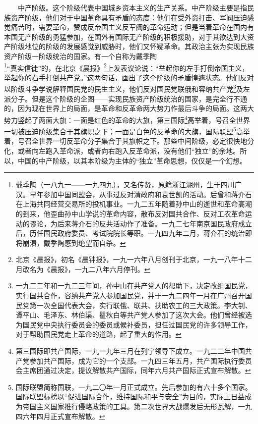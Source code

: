\documentclass[cn,11pt,chinese]{elegantbook}
\begin{document}
　　中产阶级。这个阶级代表中国城乡资本主义的生产关系。中产阶级主要是指民族资产阶级，他们对于中国革命具有矛盾的态度：他们在受外资打击、军阀压迫感觉痛苦时，需要革命，赞成反帝国主义反军阀的革命运动；但是当着革命在国内有本国无产阶级的勇猛参加，在国外有国际无产阶级的积极援助，对于其欲达到大资产阶级地位的阶级的发展感觉到威胁时，他们又怀疑革命。其政治主张为实现民族资产阶级一阶级统治的国家。有一个自称为戴季陶\footnote[2]{ 戴季陶（一八九一——一九四九），又名传贤，原籍浙江湖州，生于四川广汉。早年参加中国同盟会，从事过反对清政府和袁世凯的活动。后曾和蒋介石在上海共同经营交易所的投机事业。一九二五年随着孙中山的逝世和革命高潮的到来，他歪曲孙中山学说的革命内容，散布反对国共合作、反对工农革命运动的谬论，为后来蒋介石的反共活动作了准备。一九二七年南京国民政府成立后，历任国民政府委员、考试院院长等职。一九四九年二月，蒋介石的统治即将崩溃，戴季陶感到绝望而自杀。}“真实信徒”的，在北京《晨报》\footnote[3]{  北京《晨报》，初名《晨钟报》，一九一六年八月创刊于北京，一九一八年十二月改名为《晨报》，一九二八年六月停刊。}上发表议论说：“举起你的左手打倒帝国主义，举起你的右手打倒共产党。”这两句话，画出了这个阶级的矛盾惶遽状态。他们反对以阶级斗争学说解释国民党的民生主义，他们反对国民党联俄和容纳共产党\footnote[4]{ 一九二二年和一九二三年间，孙中山在共产党人的帮助下，决定改组国民党，实行国共合作，容纳共产党人参加国民党，并于一九二四年一月在广州召开国民党第一次全国代表大会，实行联俄、联共、扶助农工的三大政策。李大钊、谭平山、毛泽东、林伯渠、瞿秋白等共产党人参加了这次大会。他们曾经被选为国民党中央执行委员会的委员或候补委员，担任过国民党的许多领导工作，对于帮助国民党走上革命的道路，起了重大的作用。}及左派分子。但是这个阶级的企图——实现民族资产阶级统治的国家，是完全行不通的，因为现在世界上的局面，是革命和反革命两大势力作最后斗争的局面。这两大势力竖起了两面大旗：一面是红色的革命的大旗，第三国际\footnote[5]{ 第三国际即共产国际，一九一九年三月在列宁领导下成立。一九二二年中国共产党参加共产国际，成为它的一个支部。一九四三年五月，共产国际执行委员会主席团通过决定，提议解散共产国际，同年六月共产国际正式宣布解散。}高举着，号召全世界一切被压迫阶级集合于其旗帜之下；一面是白色的反革命的大旗，国际联盟\footnote[6]{ 国际联盟简称国联，一九二〇年一月正式成立。先后参加的有六十多个国家。国际联盟标榜以“促进国际合作，维持国际和平与安全”为目的，实际上日益成为帝国主义国家推行侵略政策的工具。第二次世界大战爆发后无形瓦解，一九四六年四月正式宣布解散。}高举着，号召全世界一切反革命分子集合于其旗帜之下。那些中间阶级，必定很快地分化，或者向左跑入革命派，或者向右跑入反革命派，没有他们“独立”的余地。所以，中国的中产阶级，以其本阶级为主体的“独立”革命思想，仅仅是一个幻想。\\
\end{document}
